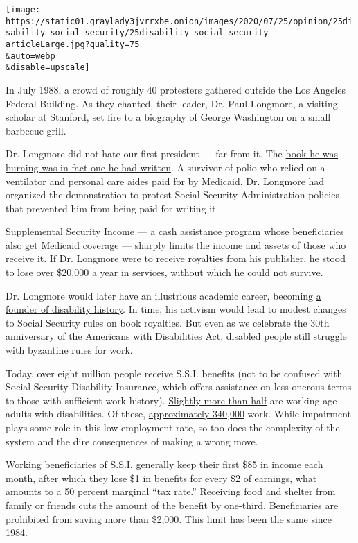\texttt{[image: https://static01.graylady3jvrrxbe.onion/images/2020/07/25/opinion/25disability-social-security/25disability-social-security-articleLarge.jpg?quality=75\\\&auto=webp\\\&disable=upscale]}

In July 1988, a crowd of roughly 40 protesters gathered outside the Los
Angeles Federal Building. As they chanted, their leader, Dr. Paul
Longmore, a visiting scholar at Stanford, set fire to a biography of
George Washington on a small barbecue grill.

Dr. Longmore did not hate our first president --- far from it. The
\href{https://www.npr.org/sections/health-shots/2010/08/11/129127432/paul-longmore-historian-and-advocate-for-disabled-dies}{book
he was burning was in fact one he had written}. A survivor of polio who
relied on a ventilator and personal care aides paid for by Medicaid, Dr.
Longmore had organized the demonstration to protest Social Security
Administration policies that prevented him from being paid for writing
it.

Supplemental Security Income --- a cash assistance program whose
beneficiaries also get Medicaid coverage --- sharply limits the income
and assets of those who receive it. If Dr. Longmore were to receive
royalties from his publisher, he stood to lose over \$20,000 a year in
services, without which he could not survive.

Dr. Longmore would later have an illustrious academic career, becoming
\href{https://longmoreinstitute.sfsu.edu/paul-k-longmore}{a founder of
disability history}. In time, his activism would lead to modest changes
to Social Security rules on book royalties. But even as we celebrate the
30th anniversary of the Americans with Disabilities Act, disabled people
still struggle with byzantine rules for work.

Today, over eight million people receive S.S.I. benefits (not to be
confused with Social Security Disability Insurance, which offers
assistance on less onerous terms to those with sufficient work history).
\href{https://www.ssa.gov/policy/docs/statcomps/ssi_monthly/2020-06/table02.html}{Slightly
more than half} are working-age adults with disabilities. Of these,
\href{https://www.ssa.gov/policy/docs/statcomps/ssi_asr/2018/sect07.html\#_blank}{approximately
340,000} work. While impairment plays some role in this low employment
rate, so too does the complexity of the system and the dire consequences
of making a wrong move.

\href{https://www.ssa.gov/pubs/EN-05-10095.pdf}{Working beneficiaries}
of S.S.I. generally keep their first \$85 in income each month, after
which they lose \$1 in benefits for every \$2 of earnings, what amounts
to a 50 percent marginal ``tax rate.'' Receiving food and shelter from
family or friends
\href{https://www.ssa.gov/ssi/text-living-ussi.htm\#_blank}{cuts the
amount of the benefit by one-third}. Beneficiaries are prohibited from
saving more than \$2,000. This
\href{https://www.ssa.gov/policy/docs/chartbooks/disability_trends/sect05.html}{limit
has been the same since 1984.}

